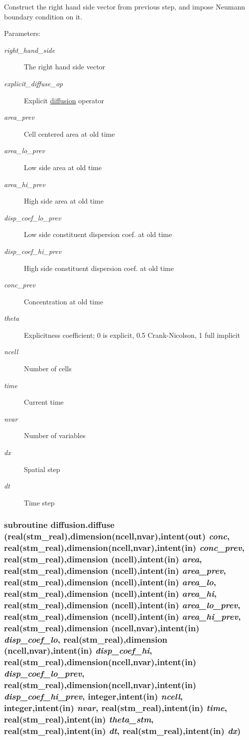 Construct the right hand side vector from previous step, and impose Neumann boundary condition on it. 

\begin{Desc}
\item[Parameters:]
\begin{description}
\item[{\em right\_\-hand\_\-side}]The right hand side vector\item[{\em explicit\_\-diffuse\_\-op}]Explicit \hyperlink{a00056}{diffusion} operator\item[{\em area\_\-prev}]Cell centered area at old time \item[{\em area\_\-lo\_\-prev}]Low side area at old time\item[{\em area\_\-hi\_\-prev}]High side area at old time \item[{\em disp\_\-coef\_\-lo\_\-prev}]Low side constituent dispersion coef. at old time\item[{\em disp\_\-coef\_\-hi\_\-prev}]High side constituent dispersion coef. at old time\item[{\em conc\_\-prev}]Concentration at old time\item[{\em theta}]Explicitness coefficient; 0 is explicit, 0.5 Crank-Nicolson, 1 full implicit \item[{\em ncell}]Number of cells\item[{\em time}]Current time\item[{\em nvar}]Number of variables\item[{\em dx}]Spatial step \item[{\em dt}]Time step \end{description}
\end{Desc}
\hypertarget{a00056_b108f04e81c5fda27fe18ee2aa18086c}{
\subsubsection[{diffuse}]{\setlength{\rightskip}{0pt plus 5cm}subroutine diffusion.diffuse (real(stm\_\-real),dimension(ncell,nvar),intent(out) {\em conc}, \/  real(stm\_\-real),dimension(ncell,nvar),intent(in) {\em conc\_\-prev}, \/  real(stm\_\-real),dimension (ncell),intent(in) {\em area}, \/  real(stm\_\-real),dimension (ncell),intent(in) {\em area\_\-prev}, \/  real(stm\_\-real),dimension (ncell),intent(in) {\em area\_\-lo}, \/  real(stm\_\-real),dimension (ncell),intent(in) {\em area\_\-hi}, \/  real(stm\_\-real),dimension (ncell),intent(in) {\em area\_\-lo\_\-prev}, \/  real(stm\_\-real),dimension (ncell),intent(in) {\em area\_\-hi\_\-prev}, \/  real(stm\_\-real),dimension (ncell,nvar),intent(in) {\em disp\_\-coef\_\-lo}, \/  real(stm\_\-real),dimension (ncell,nvar),intent(in) {\em disp\_\-coef\_\-hi}, \/  real(stm\_\-real),dimension(ncell,nvar),intent(in) {\em disp\_\-coef\_\-lo\_\-prev}, \/  real(stm\_\-real),dimension(ncell,nvar),intent(in) {\em disp\_\-coef\_\-hi\_\-prev}, \/  integer,intent(in) {\em ncell}, \/  integer,intent(in) {\em nvar}, \/  real(stm\_\-real),intent(in) {\em time}, \/  real(stm\_\-real),intent(in) {\em theta\_\-stm}, \/  real(stm\_\-real),intent(in) {\em dt}, \/  real(stm\_\-real),intent(in) {\em dx})}}
